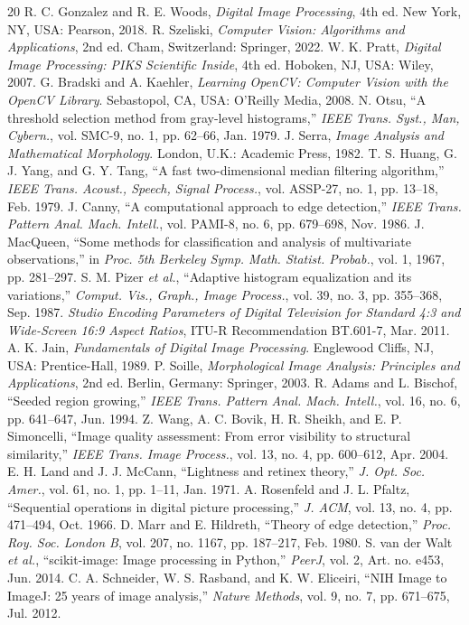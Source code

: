 \documentclass[journal]{IEEEtran}
\begin{document}
\begin{thebibliography}{20}
 R. C. Gonzalez and R. E. Woods, \textit{Digital Image Processing}, 4th ed. New York, NY, USA: Pearson, 2018.
 R. Szeliski, \textit{Computer Vision: Algorithms and Applications}, 2nd ed. Cham, Switzerland: Springer, 2022.
 W. K. Pratt, \textit{Digital Image Processing: PIKS Scientific Inside}, 4th ed. Hoboken, NJ, USA: Wiley, 2007.
 G. Bradski and A. Kaehler, \textit{Learning OpenCV: Computer Vision with the OpenCV Library}. Sebastopol, CA, USA: O'Reilly Media, 2008.
 N. Otsu, ``A threshold selection method from gray-level histograms,'' \textit{IEEE Trans. Syst., Man, Cybern.}, vol. SMC-9, no. 1, pp. 62--66, Jan. 1979.
 J. Serra, \textit{Image Analysis and Mathematical Morphology}. London, U.K.: Academic Press, 1982.
 T. S. Huang, G. J. Yang, and G. Y. Tang, ``A fast two-dimensional median filtering algorithm,'' \textit{IEEE Trans. Acoust., Speech, Signal Process.}, vol. ASSP-27, no. 1, pp. 13--18, Feb. 1979.
 J. Canny, ``A computational approach to edge detection,'' \textit{IEEE Trans. Pattern Anal. Mach. Intell.}, vol. PAMI-8, no. 6, pp. 679--698, Nov. 1986.
 J. MacQueen, ``Some methods for classification and analysis of multivariate observations,'' in \textit{Proc. 5th Berkeley Symp. Math. Statist. Probab.}, vol. 1, 1967, pp. 281--297.
 S. M. Pizer \textit{et al.}, ``Adaptive histogram equalization and its variations,'' \textit{Comput. Vis., Graph., Image Process.}, vol. 39, no. 3, pp. 355--368, Sep. 1987.
 \textit{Studio Encoding Parameters of Digital Television for Standard 4:3 and Wide-Screen 16:9 Aspect Ratios}, ITU-R Recommendation BT.601-7, Mar. 2011.
 A. K. Jain, \textit{Fundamentals of Digital Image Processing}. Englewood Cliffs, NJ, USA: Prentice-Hall, 1989.
 P. Soille, \textit{Morphological Image Analysis: Principles and Applications}, 2nd ed. Berlin, Germany: Springer, 2003.
 R. Adams and L. Bischof, ``Seeded region growing,'' \textit{IEEE Trans. Pattern Anal. Mach. Intell.}, vol. 16, no. 6, pp. 641--647, Jun. 1994.
 Z. Wang, A. C. Bovik, H. R. Sheikh, and E. P. Simoncelli, ``Image quality assessment: From error visibility to structural similarity,'' \textit{IEEE Trans. Image Process.}, vol. 13, no. 4, pp. 600--612, Apr. 2004.
 E. H. Land and J. J. McCann, ``Lightness and retinex theory,'' \textit{J. Opt. Soc. Amer.}, vol. 61, no. 1, pp. 1--11, Jan. 1971.
 A. Rosenfeld and J. L. Pfaltz, ``Sequential operations in digital picture processing,'' \textit{J. ACM}, vol. 13, no. 4, pp. 471--494, Oct. 1966.
 D. Marr and E. Hildreth, ``Theory of edge detection,'' \textit{Proc. Roy. Soc. London B}, vol. 207, no. 1167, pp. 187--217, Feb. 1980.
 S. van der Walt \textit{et al.}, ``scikit-image: Image processing in Python,'' \textit{PeerJ}, vol. 2, Art. no. e453, Jun. 2014.
 C. A. Schneider, W. S. Rasband, and K. W. Eliceiri, ``NIH Image to ImageJ: 25 years of image analysis,'' \textit{Nature Methods}, vol. 9, no. 7, pp. 671--675, Jul. 2012.
\end{thebibliography}
\end{document}
